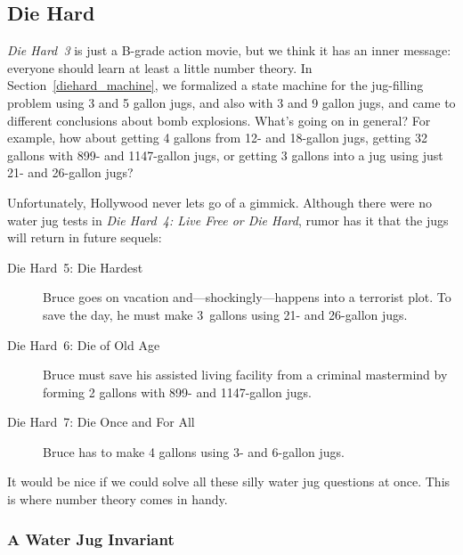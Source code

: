 \subsection{Die Hard}

\emph{Die Hard~3} is just a B-grade action movie, but we think it has
an inner message: everyone should learn at least a little number
theory.  In Section~\ref{diehard_machine}, we formalized a state
machine for the  jug-filling problem using 3 and 5
gallon jugs, and also with 3 and 9 gallon jugs, and came to different
conclusions about bomb explosions.  What's going on in general?  For
example, how about getting 4 gallons from 12- and 18-gallon jugs,
getting 32 gallons with 899- and 1147-gallon jugs, or getting 3
gallons into a jug using just 21- and 26-gallon jugs?

\begin{editingnotes}
Unfortunately, Hollywood never lets go of a gimmick.  Although there
were no water jug tests in \emph{Die Hard~4: Live Free or Die Hard},
rumor has it that the jugs will return in future sequels:
\begin{description}

\item[Die Hard~5: Die Hardest] Bruce goes on vacation and---shockingly---happens into a
  terrorist plot.  To save the day, he must make 3~gallons using 21- and 26-gallon jugs.

\item[Die Hard~6: Die of Old Age] Bruce must save his assisted living facility from a
  criminal mastermind by forming 2 gallons with 899- and 1147-gallon jugs.

\item[Die Hard~7: Die Once and For All] Bruce has to make 4 gallons using 3- and 6-gallon
  jugs.

\end{description}
\end{editingnotes}

It would be nice if we could solve all these silly water jug questions
at once.  \iffalse In particular, how can one form $g$ gallons using
jugs with capacities $a$ and~$b$?\fi This is where number theory comes
in handy.

\subsubsection{A Water Jug Invariant}\label{jug_invar_subsubsec}

